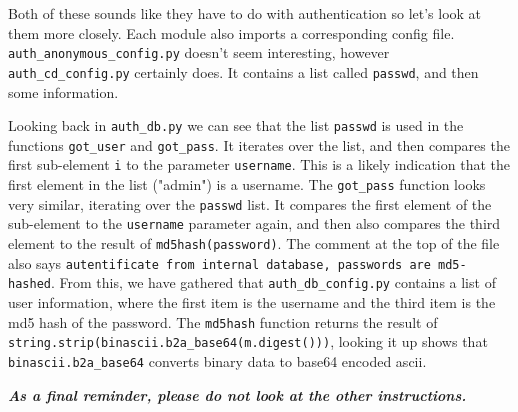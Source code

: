 {                    Both of these sounds like they have to do with authentication so let's look at them more closely. Each module also imports a corresponding config file. \lstinline`auth_anonymous_config.py` doesn't seem interesting, however \lstinline`auth_cd_config.py` certainly does. It contains a list called \lstinline`passwd`, and then some information. 

                    Looking back in \lstinline`auth_db.py` we can see that the list \lstinline`passwd` is used in the functions \lstinline`got_user` and \lstinline`got_pass`. It iterates over the list, and then compares the first sub-element \lstinline`i` to the parameter \lstinline`username`. This is a likely indication that the first element in the list ("admin") is a username. The \lstinline`got_pass` function looks very similar, iterating over the \lstinline`passwd` list. It compares the first element of the sub-element to the \lstinline`username` parameter again, and then also compares the third element to the result of \lstinline`md5hash(password)`. The comment at the top of the file also says \lstinline`autentificate from internal database, passwords are md5-hashed`. From this, we have gathered that \lstinline`auth_db_config.py` contains a list of user information, where the first item is the username and the third item is the md5 hash of the password. The \lstinline`md5hash` function returns the result of \lstinline`string.strip(binascii.b2a_base64(m.digest()))`, looking it up shows that \lstinline`binascii.b2a_base64` converts binary data to base64 encoded ascii. 

                    \textbf{\textit{As a final reminder, please do not look at the other instructions.}}
            
            }